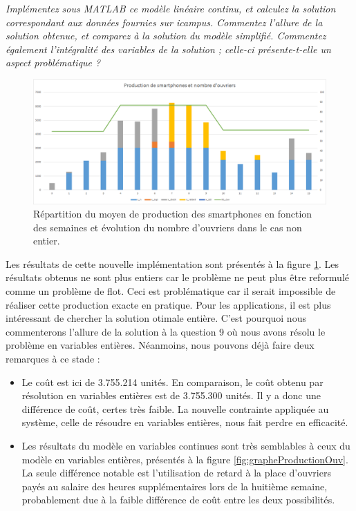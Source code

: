 \question %
\emph{Implémentez sous MATLAB ce modèle linéaire continu,
et calculez la solution correspondant aux données fournies sur icampus.
Commentez l'allure de la solution obtenue, et comparez à la solution du modèle
simplifié. Commentez également l'intégralité des variables de la solution ;
celle-ci présente-t-elle un aspect problématique ?}

\begin{figure}[H]
  \begin{center}
    \includegraphics[scale = 0.75]{img/grapheProductionOuvNonInt.png}
	  \caption{Répartition du moyen de production des smartphones en fonction des semaines et évolution du nombre d'ouvriers dans le cas non entier.}
	  \label{fig:grapheProductionOuvNonInt}
  \end{center}
\end{figure}

Les résultats de cette nouvelle implémentation sont présentés à la figure \ref{fig:grapheProductionOuvNonInt}. Les résultats obtenus ne sont plus entiers car le problème ne peut plus être reformulé comme un problème de flot. Ceci est problématique car il serait impossible de réaliser cette production exacte en pratique. Pour les applications, il est plus intéressant de chercher la solution otimale entière. C'est pourquoi nous commenterons l'allure de la solution à la question 9 où nous avons résolu le problème en variables entières. Néanmoins, nous pouvons déjà faire deux remarques à ce stade :
\begin{itemize}
\item Le coût est ici de 3.755.214 unités. En comparaison, le coût obtenu par résolution en variables entières est de 3.755.300 unités. Il y a donc une différence de coût, certes très faible. La nouvelle contrainte appliquée au système, celle de résoudre en variables entières, nous fait perdre en efficacité. 
\item Les résultats du modèle en variables continues sont très semblables à ceux du modèle en variables entières, présentés à la figure \ref{fig:grapheProductionOuv}. La seule différence notable est l'utilisation de retard à la place d'ouvriers payés au salaire des heures supplémentaires lors de la huitième semaine, probablement due à la faible différence de coût entre les deux possibilités.
\end{itemize}